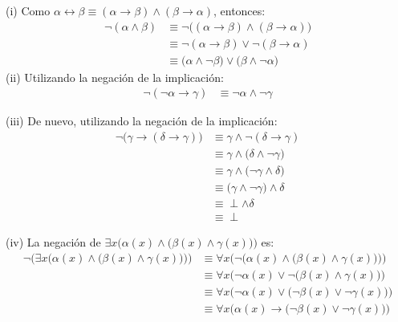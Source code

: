 \documentclass[letterpaper,DIV=14,headsepline,12pt]{scrartcl}
\makeatletter
\newenvironment{solu}[1][]{%
        \par\pushQED{\hfill \lozenge}%
        \normalfont\topsep6pt \partopsep0pt %
        \trivlist
        \item[\hskip\labelsep
                \textbf{\textit{Solución.}}%
        ]#1
        }{%
        \popQED\endtrivlist\@endpefalse
    }
\makeatother
\begin{document}
    \begin{solu}
        (i) Como $\alpha \leftrightarrow \beta \equiv (\alpha \to \beta) \land (\beta \to \alpha)$, entonces:
        \begin{align*}
            \lnot(\alpha \land \beta) & \equiv \lnot\big( (\alpha \to \beta) \land (\beta \to \alpha) \big) \tag*{Equivalencia de $\leftrightarrow$} \\
            & \equiv \lnot(\alpha \to \beta) \lor \lnot(\beta \to \alpha) \tag*{Ley de De Morgan} \\
            & \equiv \big( \alpha \land \lnot\beta \big) \lor \big( \beta \land \lnot\alpha \big) \tag*{Negación de $\to$}
        \end{align*}
        (ii) Utilizando la negación de la implicación:
        \begin{align*}
            \lnot(\lnot \alpha \to \gamma) & \equiv \lnot \alpha \land \lnot \gamma \tag*{Negación de $\to$}
        \end{align*}

        (iii) De nuevo, utilizando la negación de la implicación:
        \begin{align*}
            \lnot\big(\gamma \to (\delta \to \gamma)\big) & \equiv \gamma \land \lnot(\delta \to \gamma) \tag*{Negación de $\to$} \\
            & \equiv \gamma \land \big( \delta \land \lnot \gamma \big) \tag*{Negación de $\to$} \\
            & \equiv \gamma \land \big( \lnot \gamma \land \delta \big) \tag*{Conmutatividad de $\land$} \\
            & \equiv \big( \gamma \land \lnot \gamma \big) \land \delta \tag*{Asociatividad de $\land$} \\
            & \equiv \perp \land \delta \tag*{$\gamma \land \lnot \gamma$ siempre es contradicción} \\
            & \equiv \perp \tag*{$\perp \land \, P$ siempre es contradicción} 
        \end{align*}

        (iv) La negación de $\exists x \big( \alpha(x) \land \big( \beta(x) \land \gamma(x) \big) \big)$ es:
        \begin{align*}
            \lnot \Big( \exists x \big( \alpha(x) \land \big( \beta(x) \land \gamma(x) \big) \big) \Big) & \equiv \forall x \Big( \lnot \big( \alpha(x) \land \big( \beta(x) \land \gamma(x) \big) \big) \Big) \tag*{Negación de $\exists$} \\
            & \equiv \forall x \Big( \lnot \alpha(x) \lor \lnot \big( \beta(x) \land \gamma(x) \big) \Big) \tag*{Ley de De Morgan} \\
            & \equiv \forall x \Big( \lnot \alpha(x) \lor \big( \lnot \beta(x) \lor \lnot \gamma(x) \big) \Big) \tag*{Ley de De Morgan} \\
            & \equiv \forall x \Big( \alpha(x) \to \big( \lnot \beta(x) \lor \lnot \gamma(x) \big) \Big) \tag*{$\lnot P \lor Q \equiv P \to Q$}
        \end{align*}


\end{solu}
\end{document}

